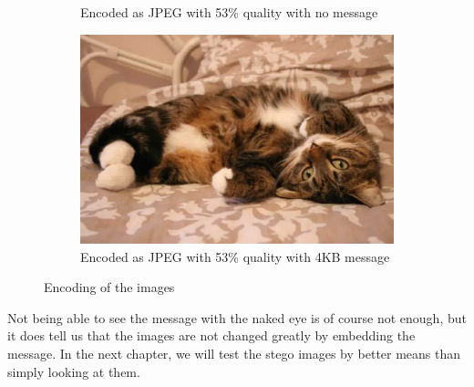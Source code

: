 \begin{figure}[H]
\begin{subfigure}[b]{0.45\textwidth}
        \caption{Encoded as JPEG with 53\% quality with no message}
        \label{fig:catJPEGNoMessage}
    \end{subfigure}
    \begin{subfigure}[b]{0.45\textwidth}
        \includegraphics[width=\textwidth]{figures/catToTestWithMessage.jpeg}
        \caption{Encoded as JPEG with 53\% quality with 4KB message}
        \label{fig:catJPEGMessage}
    \end{subfigure}
    \caption{Encoding of the images \citep{FlickrImageCat}}
    \label{fig:ResultEncoding}
\end{figure}

Not being able to see the message with the naked eye is of course not enough, but it does tell us that the images are not changed greatly by embedding the message.
In the next chapter, we will test the stego images by better means than simply looking at them. 